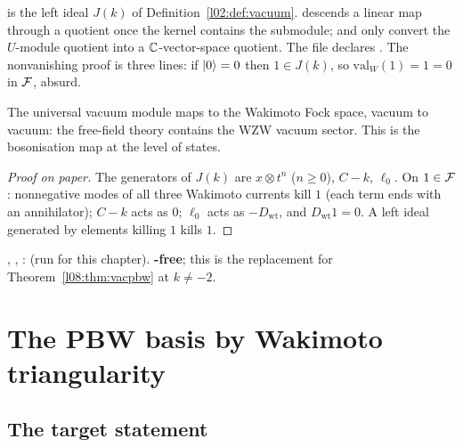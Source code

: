 \begin{dictionary}
 is the left ideal $J(k)$ of Definition~\ref{l02:def:vacuum}.  descends a
linear map through a quotient once the kernel contains the submodule;  and
 only convert the $U$-module quotient into a ${\mathbb{C}}$-vector-space quotient. The
file declares . The nonvanishing proof is three lines: if
$|0\rangle=0$ then $1\in J(k)$, so $\mathrm{val}_W(1) = 1 = 0$ in $\mathcal{F}$, absurd.
\end{dictionary}

\begin{physics}
The universal vacuum module maps to the Wakimoto Fock space, vacuum to vacuum: the free-field theory
contains the WZW vacuum sector. This is the bosonisation map at the level of states.
\end{physics}

\begin{proof}[Proof on paper]
The generators of $J(k)$ are $x\otimes t^n$ ($n\ge0$), $C-k$, $\ell_0$. On $1\in\mathcal{F}$:
nonnegative modes of all three Wakimoto currents kill $1$ (each term ends with an annihilator);
$C-k$ acts as $0$; $\ell_0$ acts as $-D_{\mathrm{wt}}$, and $D_{\mathrm{wt}}1=0$. A left ideal generated
by elements killing $1$ kills $1$.
\end{proof}

\begin{status}
\allowbreak{}\allowbreak{}\allowbreak{}, \allowbreak{}\allowbreak{}\allowbreak{}\allowbreak{}\allowbreak{},
\allowbreak{}\allowbreak{}\allowbreak{}: \lean{[propext, Classical.}\allowbreak{}\allowbreak\lean{sound]}
(run for this chapter). \textbf{-free}; this is the replacement for
Theorem~\ref{l08:thm:vacpbw} at $k\ne-2$.
\end{status}

\section{The PBW basis by Wakimoto triangularity}\label{l08:sec:pbw}

\subsection{The target statement}

